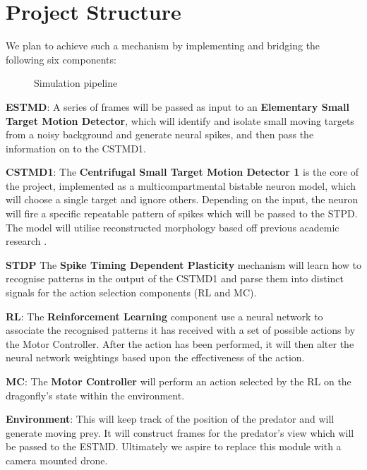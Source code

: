 \section{Project Structure}

\par We plan to achieve such a mechanism by implementing and bridging the following six components:

\begin{figure}
  \centering
  \caption{Simulation pipeline}
  \label{modules}
\end{figure}


 \par \textbf{ESTMD}: A series of frames will be passed as input to an \textbf{Elementary Small Target Motion Detector}, which will identify and isolate small moving targets from a noisy background\cite{ESTMD1} and generate neural spikes\cite{ESTMD2}, and then pass the information\cite{ESTMD3} on to the CSTMD1.
 \par \textbf{CSTMD1}: The \textbf{Centrifugal Small Target Motion Detector 1} is the core of the project, implemented as a multicompartmental bistable neuron model\cite{CSTMD1}, which will choose a single target and ignore others. Depending on the input, the neuron will fire a specific repeatable pattern of spikes which will be passed to the STPD. The model will utilise reconstructed morphology based off previous academic research  \cite{Geurten3277}.
 \par \textbf{STDP} The \textbf{Spike Timing Dependent Plasticity} mechanism will learn how to recognise patterns \cite{stdp1}\cite{stdp2} in the output of the CSTMD1 and parse them into distinct signals for the action selection components (RL and MC).
 \par \textbf{RL}: The \textbf{Reinforcement Learning} component use a neural network to associate the recognised patterns \cite{IZ1} it has received with a set of possible actions by the Motor Controller. After the action has been performed, it will then alter the neural network weightings based upon the effectiveness of the action.
\par \textbf{MC}: The \textbf{Motor Controller} will perform an action selected by the RL on the dragonfly's state within the environment.
\par \textbf{Environment}: This will keep track of the position of the predator and will generate moving prey. It will construct frames for the predator's view which will be passed to the ESTMD. Ultimately we aspire to replace this module with a camera mounted drone.
  
